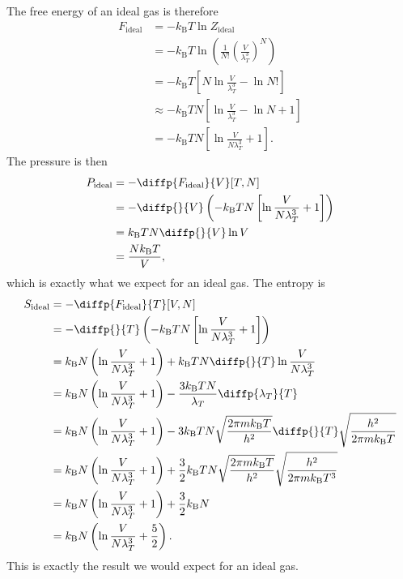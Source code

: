 \documentclass[fleqn]{NotesClass}
\newcommand*{\boltzmann}{k_{\mathrm{B}}}
\begin{document}
    The free energy of an ideal gas is therefore
    \begin{align}
        F_{\mathrm{ideal}} &= -\boltzmann T \ln Z_{\mathrm{ideal}}\\
        &= -\boltzmann T \ln\left( \frac{1}{N!} \left( \frac{V}{\lambda_T^3} \right)^N \right)\\
        &= -\boltzmann T \left[ N\ln \frac{V}{\lambda_T^3} - \ln N! \right]\\
        &\approx -\boltzmann T N \left[ \ln\frac{V}{\lambda_T^3} - \ln N + 1 \right]\\
        &= -\boltzmann T N \left[ \ln \frac{V}{N\lambda_T^3} + 1 \right].
    \end{align}
    The pressure is then
    \begin{align}
        P_{\mathrm{ideal}} &= - \diffp{F_{\mathrm{ideal}}}{V}[T, N]\\
        &= -\diffp{}{V} \left( -\boltzmann T N \left[ \ln\frac{V}{N\lambda_T^3} + 1 \right] \right)\\
        &= \boltzmann T N \diffp{}{V} \ln V\\
        &= \frac{N \boltzmann T}{V},
    \end{align}
    which is exactly what we expect for an ideal gas.
    The entropy is
    \begin{align}
        S_{\mathrm{ideal}} &= -\diffp{F_{\mathrm{ideal}}}{T}[V, N]\\
        &= -\diffp{}{T}\left( -\boltzmann T N \left[ \ln\frac{V}{N\lambda_T^3} + 1 \right] \right)\\
        &= \boltzmann N \left( \ln \frac{V}{N\lambda_T^3} + 1 \right) + \boltzmann T N \diffp{}{T} \ln \frac{V}{N\lambda_T^3}\\
        &= \boltzmann N \left( \ln\frac{V}{N\lambda_T^3} + 1 \right) - \frac{3 \boltzmann T N}{\lambda_T} \diffp{\lambda_T}{T}\\
        &= \boltzmann N \left( \ln\frac{V}{N\lambda_T^3} + 1 \right) - 3 \boltzmann T N \sqrt{\frac{2\pi m \boltzmann T}{h^2}} \diffp{}{T} \sqrt{\frac{h^2}{2\pi m\boltzmann T}}\\
        &= \boltzmann N \left( \ln\frac{V}{N\lambda_T^3} + 1 \right) + \frac{3}{2} \boltzmann T N \sqrt{\frac{2\pi m \boltzmann T}{h^2}}\sqrt{\frac{h^2}{2\pi m \boltzmann T^3}}\\
        &= \boltzmann N \left( \ln\frac{V}{N\lambda_T^3} + 1 \right) + \frac{3}{2}\boltzmann N\\
        &= \boltzmann N \left( \ln\frac{V}{N\lambda_T^3} + \frac{5}{2} \right).
    \end{align}
    This is exactly the result we would expect for an ideal gas.
    
\end{document}
